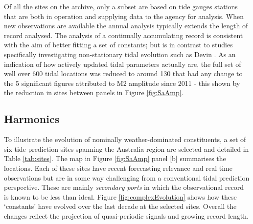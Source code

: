 Of all the sites on the archive, only a subset are based on tide gauges stations that are both in operation and supplying data to the agency for analysis. When new observations are available the annual analysis typically extends the length of record analysed.   The analysis of a continually accumulating record is consistent with the aim of better fitting a set of constants; but is in contrast to studies specifically investigating non-stationary tidal evolution such as Devin \cite{10.1002/2017jc013165}.
As an indication of how actively updated tidal parameters actually are, the full set of well over 600 tidal locations was reduced to around 130 that had any change to the 5 significant figures attributed to M2 amplitude since 2011 - this shown by the reduction in sites between panels in Figure \ref{fig:SaAmp}.


\subsection{Harmonics}
To illustrate the evolution of nominally weather-dominated constituents, a set of six tide prediction sites spanning the Australia region are selected and detailed in Table \ref{tab:sites}.  The map in Figure  \ref{fig:SaAmp} panel [b] summarises the locations.
Each of these sites have recent forecasting relevance and real time observations but are in some way challenging from a conventional tidal prediction perspective.   These are mainly \textit{secondary ports} in which the observational record is known to be less than ideal. 
Figure \ref{fig:complexEvolution} shows how these `constants' have evolved over the last decade at the selected sites.   Overall the changes reflect the projection of quasi-periodic signals and growing record length.  

 

